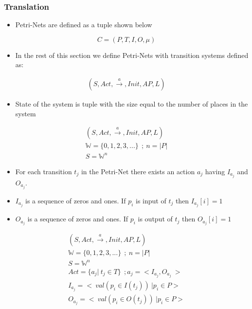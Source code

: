 \begin{frame}
    \frametitle{Translation}
    \begin{itemize}
        \item {Petri-Nets are defined as a tuple shown below}
    \end{itemize}
    \[C = (P, T, I, O, \mu)\]
    \begin{itemize}
        \item {In the rest of this section we define Petri-Nets with transition systems defined as:}
    \end{itemize}
    \begin{gather*}
    (S, Act, \xrightarrow{a}, Init, AP, L)
    \end{gather*}
\end{frame}

\begin{frame}
    \begin{itemize}
        \item {State of the system is tuple with the size equal to the number of places in the system}
    \end{itemize}
    \begin{gather*}
        (S, Act, \xrightarrow{a}, Init, AP, L) \\
        \mathbb{W} = \{0, 1, 2, 3, ...\} ~ ~ ; ~ n = | P |
        \\
        S =\mathbb{W} ^ n
    \end{gather*}
\end{frame}

\begin{frame}
    \begin{itemize}
        \item {For each transition $t_j$ in the Petri-Net there exists
        an action $a_j$
        having $I_{a_j}$ and $O_{a_j}$.}
        \item {$I_{a_j}$ is a sequence of zeros and ones. If $p_i$ is input of $t_j$ then $I_{a_j}[i] = 1$}
        \item {$O_{a_j}$ is a sequence of zeros and ones. If $p_i$ is output of $t_j$ then $O_{a_j}[i] = 1$}
    \end{itemize}
    \begin{gather*}
        (S, Act, \xrightarrow{a}, Init, AP, L) \\
        \mathbb{W} = \{0, 1, 2, 3, ...\} ~ ~ ; ~ n = | P |
        \\
        S =\mathbb{W} ^ n
        \\
        Act = \{a_j | ~ t_j \in T\} ~ ~ ; a_j = < I_{a_j},  O_{a_j} ~ >
        \\
        I_{a_j} = < ~ val(p_i \in I(t_j)) ~ | p_i \in P>
        \\
        O_{a_j} = < ~ val(p_i \in O(t_j)) ~ | p_i \in P>
    \end{gather*}
\end{frame}

